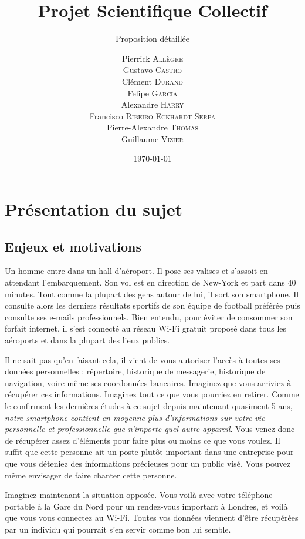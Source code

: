 \documentclass[a4paper, 12pt,twoside]{article}
\title{Projet Scientifique Collectif}
\author{Pierrick \textsc{Allègre} \\
		Gustavo \textsc{Castro} \\
		Clément \textsc{Durand} \\
		Felipe \textsc{Garcia} \\
		Alexandre \textsc{Harry} \\
		Francisco \textsc{Ribeiro Eckhardt Serpa} \\
		Pierre-Alexandre \textsc{Thomas} \\
		Guillaume \textsc{Vizier} \\}
\subtitle{Proposition détaillée}
\date{\today}
\begin{document}
\maketitle
\renewcommand{\baselinestretch}{1.1}
\setlength{\parskip}{0.5em}
\tableofcontents\clearpage



\section{Présentation du sujet}
	
	\subsection{Enjeux et motivations}
	
	Un homme entre dans un hall d'aéroport. Il pose ses valises et s'assoit en attendant l'embarquement. Son vol est en direction de New-York et part dans 40 minutes. Tout comme la plupart des gens autour de lui, il sort son smartphone.  Il consulte alors les derniers résultats sportifs de son équipe de football préférée puis consulte ses e-mails professionnels. Bien entendu, pour éviter de consommer son forfait internet, il s'est connecté au réseau \newcommand{\wifi}{Wi-Fi} \wifi{} gratuit proposé dans tous les aéroports et dans la plupart des lieux publics.
		
	Il ne sait pas qu'en faisant cela, il vient de vous autoriser l'accès à toutes ses données personnelles : répertoire, historique de messagerie, historique de navigation, voire même ses coordonnées bancaires. Imaginez que vous arriviez à récupérer ces informations. Imaginez tout ce que vous pourriez en retirer. Comme le confirment les dernières études à ce sujet depuis maintenant quasiment 5 ans, \emph{notre smartphone contient en moyenne plus d'informations sur votre vie personnelle et professionnelle que n'importe quel autre appareil}. Vous venez donc de récupérer assez d'éléments pour faire plus ou moins ce que vous voulez. Il suffit que cette personne ait un poste plutôt important dans une entreprise pour que vous déteniez des informations précieuses pour un public visé. Vous pouvez même envisager de faire chanter cette personne.
		
	Imaginez maintenant la situation opposée. Vous voilà avec votre téléphone portable à la Gare du Nord pour un rendez-vous important à Londres, et voilà que vous vous connectez au \wifi{}. Toutes vos données viennent d'être récupérées par un individu qui pourrait s'en servir comme bon lui semble. 
		
\end{document}

